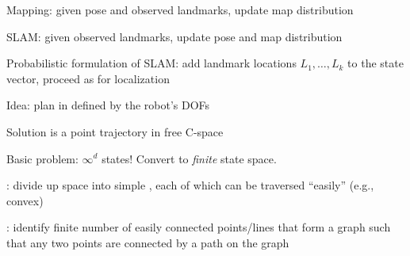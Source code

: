 \documentclass{article}
\begin{document}
\begin{huge}
Mapping: given pose and observed landmarks, update map distribution

SLAM: given observed landmarks, update pose and map distribution

Probabilistic formulation of SLAM: \al
 add landmark locations $L_1,\ldots,L_k$ to the state vector,\al
 proceed as for localization


\vspace*{0.2in}

\centerline{\textheight{}\qquad{}\textheight{}}
\centerline{\textheight{}\qquad{}\textheight{}}


\vspace*{0.2in}



Idea: plan in  defined by the robot's DOFs

\vspace*{0.2in}

\centerline{\qquad{}}

Solution is a point trajectory in free C-space


Basic problem: $\infty^d$ states! Convert to \emph{finite} state space.

:\al
  divide up space into simple , \al
  each of which can be traversed ``easily'' (e.g., convex)

:\al
  identify finite number of easily connected points/lines\al
  that form a graph such that any two points are connected\al
  by a path on the graph




\end{huge}
\end{document}

